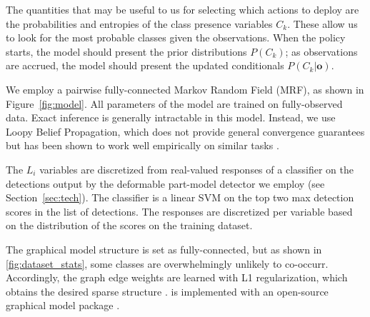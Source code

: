 
The quantities that may be useful to us for selecting which actions to deploy are the probabilities and entropies of the class presence variables $C_k$.
These allow us to look for the most probable classes given the observations.
When the policy starts, the model should present the prior distributions $P(C_k)$; as observations are accrued, the model should present the updated conditionals $P(C_k|\mathbf{o})$.

We employ a pairwise fully-connected Markov Random Field (MRF), as shown in Figure~\ref{fig:model}.
All parameters of the model are trained on fully-observed data.
Exact inference is generally intractable in this model.
Instead, we use Loopy Belief Propagation, which does not provide general convergence guarantees but has been shown to work well empirically on similar tasks \cite{Desai2009}.

The $L_i$ variables are discretized from real-valued responses of a classifier on the detections output by the deformable part-model detector we employ (see Section~\ref{sec:tech}).
The classifier is a linear SVM on the top two max detection scores in the list of detections.
The responses are discretized per variable based on the distribution of the scores on the training dataset.

The graphical model structure is set as fully-connected, but as shown in \autoref{fig:dataset_stats}, some classes are overwhelmingly unlikely to co-occurr.
Accordingly, the graph edge weights are learned with L1 regularization, which obtains the desired sparse structure \cite{Lee2006}.
 is implemented with an open-source graphical model package \cite{Jaimovich2010}.

